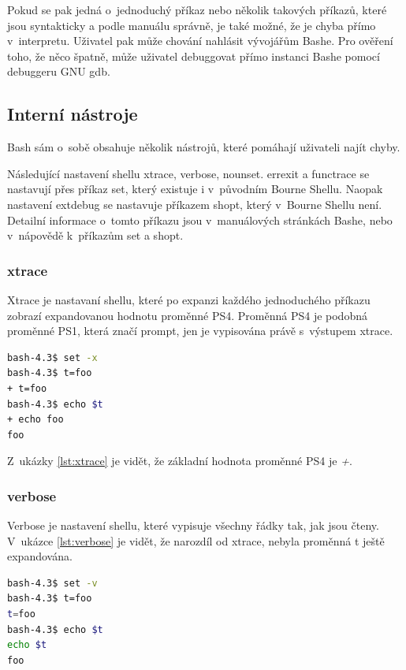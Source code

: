\documentclass[thesis=M,czech]{FITthesis}[2012/06/26]
\begin{document}
Pokud se pak jedná o~jednoduchý příkaz nebo několik takových příkazů, které jsou syntakticky a podle manuálu správně, je také možné, že je chyba přímo v~interpretu. Uživatel pak může chování nahlásit vývojářům Bashe. Pro ověření toho, že něco špatně, může uživatel debuggovat přímo instanci Bashe pomocí debuggeru GNU gdb.



%
\subsection{Interní nástroje}

Bash sám o~sobě obsahuje několik nástrojů, které pomáhají uživateli najít chyby.

Následující nastavení shellu xtrace, verbose, nounset. errexit a functrace se nastavují přes příkaz set, který existuje i v~původním Bourne Shellu. Naopak nastavení extdebug se nastavuje příkazem shopt, který v~Bourne Shellu není. Detailní informace o~tomto příkazu jsou v~manuálových stránkách Bashe, nebo v~nápovědě k~příkazům set a shopt.

\subsubsection{xtrace}

Xtrace je nastavaní shellu, které po expanzi každého jednoduchého příkazu zobrazí expandovanou hodnotu proměnné PS4. Proměnná PS4 je podobná proměnné PS1, která značí prompt, jen je vypisována právě s~výstupem xtrace.

\begin{lstlisting}[language=bash, caption={Nastavení xtrace}, label={lst:xtrace}]
bash-4.3$ set -x
bash-4.3$ t=foo
+ t=foo
bash-4.3$ echo $t
+ echo foo
foo
\end{lstlisting}

Z~ukázky \ref{lst:xtrace} je vidět, že základní hodnota proměnné PS4 je \textit{+}.

\subsubsection{verbose}

Verbose je nastavení shellu, které vypisuje všechny řádky tak, jak jsou čteny. V~ukázce \ref{lst:verbose} je vidět, že narozdíl od xtrace, nebyla proměnná t ještě expandována.

\begin{lstlisting}[language=bash, caption={Nastavní verbose}, label={lst:verbose}]
bash-4.3$ set -v
bash-4.3$ t=foo
t=foo
bash-4.3$ echo $t
echo $t
foo
\end{lstlisting}
\end{document}
